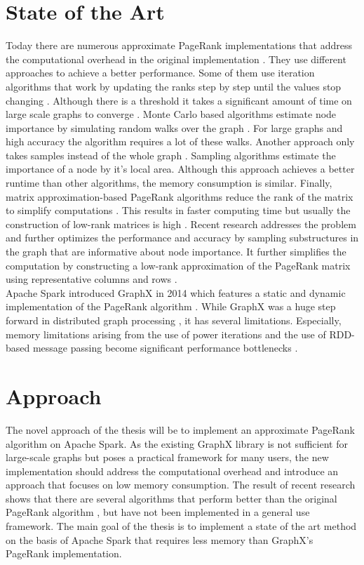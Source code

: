 \documentclass[a4paper,12pt]{article}
\begin{document}
\section{State of the Art}
Today there are numerous approximate PageRank implementations that address the computational overhead in the original implementation  \cite{wu_efficient_2024}. They use different approaches to achieve a better performance. Some of them use iteration algorithms that work by updating the ranks step by step until the values stop changing \cite{xie_parameterized_2023}\cite{anikin_efficient_2022}. Although there is a threshold it takes a significant amount of time on large scale graphs to converge \cite{wu_efficient_2024}. Monte Carlo based algorithms estimate node importance by simulating random walks over the graph \cite{avrachenkov_monte_2007}. For large graphs and high accuracy the algorithm requires a lot of these walks. Another approach only takes samples instead of the whole graph \cite{wu_approxrank_2009}\cite{bar-yossef_local_2008}. Sampling algorithms estimate the importance of a node by it's local area. Although this approach achieves a better runtime than other algorithms, the memory consumption is similar. Finally, matrix approximation-based PageRank algorithms reduce the rank of the matrix to simplify computations \cite{liu_fast_2015}. This results in faster computing time but usually the construction of low-rank matrices is high . Recent research addresses the problem and further optimizes the performance and accuracy by sampling substructures in the graph that are informative about node importance. It further simplifies the computation by constructing a low-rank approximation of the PageRank matrix using representative columns and rows \cite{wu_efficient_2024}. \\Apache Spark introduced GraphX in 2014 which features a static and dynamic implementation of the PageRank algorithm \cite{xin_graphx_2013}. While GraphX was a huge step forward in distributed graph processing \cite{gonzalez_graphx_2014-1}, it has several limitations. Especially, memory limitations arising from the use of power iterations \cite{page_pagerank_1999} and the use of RDD-based message passing become significant performance bottlenecks \cite{xin_graphx_2014}\cite{xin_graphx_2013}.
 

\section{Approach}
The novel approach of the thesis will be to implement an approximate PageRank algorithm on Apache Spark. As the existing GraphX library is not sufficient for large-scale graphs but poses a practical framework for many users, the new implementation should address the computational overhead and introduce an approach that focuses on low memory consumption. 
The result of recent research shows that there are several algorithms that perform better than the original PageRank algorithm \cite{wu_efficient_2024}, but have not been implemented in a general use framework. The main goal of the thesis is to implement a state of the art method on the basis of Apache Spark that requires less memory than GraphX's PageRank implementation. 
\end{document}
